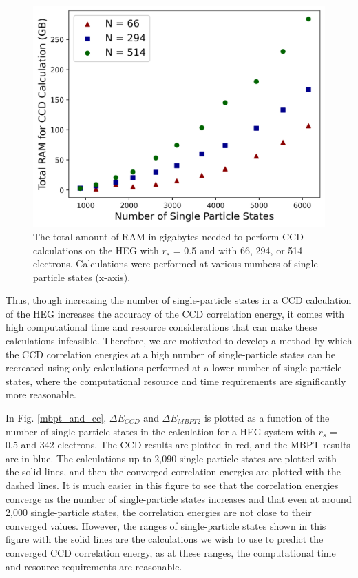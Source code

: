 \begin{figure}
    \centering
    \includegraphics[scale=0.75]{Images/Chapter7/EG_RAM.png}
    \caption{The total amount of RAM in gigabytes needed to perform CCD calculations on the HEG with $r_s$ = 0.5 and with 66, 294, or 514 electrons.  Calculations were performed at various numbers of single-particle states (x-axis).}
    \label{fig:eg_ram}
\end{figure}

Thus, though increasing the number of single-particle states in a CCD calculation of the HEG increases the accuracy of the CCD correlation energy, it comes with high computational time and resource considerations that can make these calculations infeasible. Therefore, we are motivated to develop a method by which the CCD correlation energies at a high number of single-particle states can be recreated using only calculations performed at a lower number of single-particle states, where the computational resource and time requirements are significantly more reasonable.

In Fig. \ref{mbpt_and_cc}, $\Delta E_{CCD}$ and $\Delta E_{MBPT2}$ is plotted as a function of the number of single-particle states in the calculation for a HEG system with $r_s$ = 0.5 and 342 electrons. The CCD results are plotted in red, and the MBPT results are in blue. The calculations up to 2,090 single-particle states are plotted with the solid lines, and then the converged correlation energies are plotted with the dashed lines. It is much easier in this figure to see that the correlation energies converge as the number of single-particle states increases and that even at around 2,000 single-particle states, the correlation energies are not close to their converged values. However, the ranges of single-particle states shown in this figure with the solid lines are the calculations we wish to use to predict the converged CCD correlation energy, as at these ranges, the computational time and resource requirements are reasonable.

